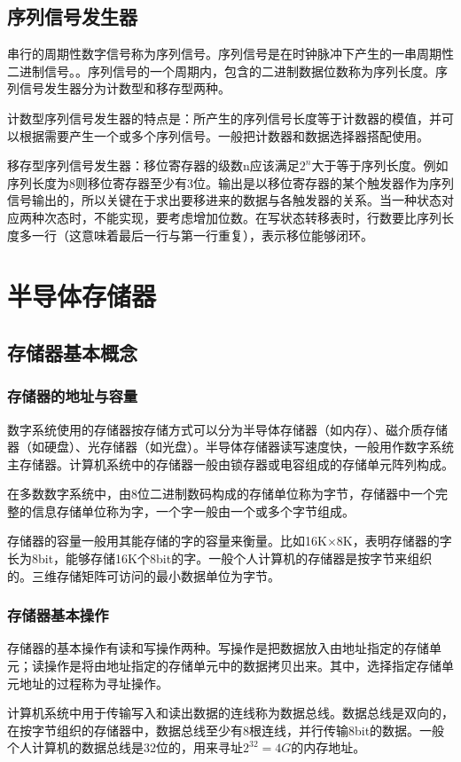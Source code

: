 \documentclass{ctexart}
\begin{document}
\subsection{序列信号发生器}
串行的周期性数字信号称为序列信号。序列信号是在时钟脉冲下产生的一串周期性二进制信号。。序列信号的一个周期内，包含的二进制数据位数称为序列长度。序列信号发生器分为计数型和移存型两种。

计数型序列信号发生器的特点是：所产生的序列信号长度等于计数器的模值，并可以根据需要产生一个或多个序列信号。一般把计数器和数据选择器搭配使用。

移存型序列信号发生器：移位寄存器的级数n应该满足$2^n$大于等于序列长度。例如序列长度为8则移位寄存器至少有3位。输出是以移位寄存器的某个触发器作为序列信号输出的，所以关键在于求出要移进来的数据与各触发器的关系。当一种状态对应两种次态时，不能实现，要考虑增加位数。在写状态转移表时，行数要比序列长度多一行（这意味着最后一行与第一行重复），表示移位能够闭环。
\section{半导体存储器}
\subsection{存储器基本概念}
\subsubsection{存储器的地址与容量}
数字系统使用的存储器按存储方式可以分为半导体存储器（如内存）、磁介质存储器（如硬盘）、光存储器（如光盘）。半导体存储器读写速度快，一般用作数字系统主存储器。计算机系统中的存储器一般由锁存器或电容组成的存储单元阵列构成。

在多数数字系统中，由8位二进制数码构成的存储单位称为字节，存储器中一个完整的信息存储单位称为字，一个字一般由一个或多个字节组成。

存储器的容量一般用其能存储的字的容量来衡量。比如16K$\times$8K，表明存储器的字长为8bit，能够存储16K个8bit的字。一般个人计算机的存储器是按字节来组织的。三维存储矩阵可访问的最小数据单位为字节。
\subsubsection{存储器基本操作}
存储器的基本操作有读和写操作两种。写操作是把数据放入由地址指定的存储单元；读操作是将由地址指定的存储单元中的数据拷贝出来。其中，选择指定存储单元地址的过程称为寻址操作。

计算机系统中用于传输写入和读出数据的连线称为数据总线。数据总线是双向的，在按字节组织的存储器中，数据总线至少有8根连线，并行传输8bit的数据。一般个人计算机的数据总线是32位的，用来寻址$2^{32}=4G$的内存地址。
\end{document}
